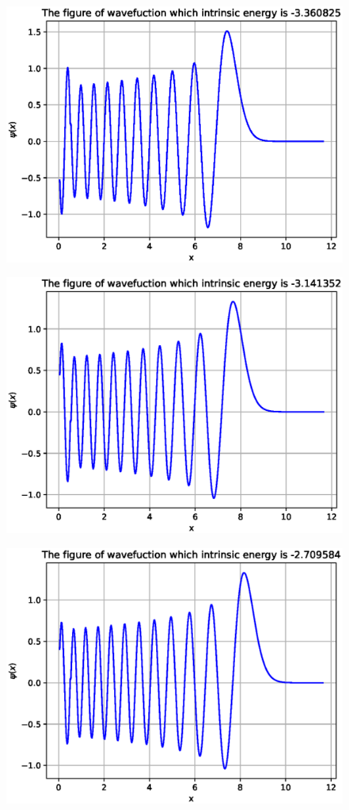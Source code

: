 \documentclass[twoside,twocolumn]{article}
\begin{document}
\begin{CJK*}{UTF8}{gkai}
\begin{figure}
	\label{fig:19}
\end{figure}
\begin{figure}
	\centering
	\includegraphics[width=0.9\linewidth]{figure/20}
	\label{fig:20}
\end{figure}
\begin{figure}
	\centering
	\includegraphics[width=0.9\linewidth]{figure/21}
	\label{fig:21}
\end{figure}
\begin{figure}
	\centering
	\includegraphics[width=0.9\linewidth]{figure/22}

\end{figure}
\end{CJK*}
\end{document}
